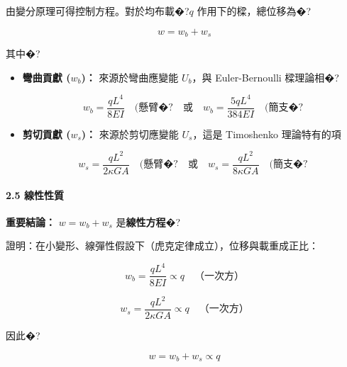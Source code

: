 \documentclass[UTF8, a4paper, 12pt]{ctexart}
\begin{document}
由變分原理可得控制方程。對於均布載�?$q$ 作用下的樑，總位移為�?



$$w = w_b + w_s$$



其中�?

\begin{itemize}

    \item \textbf{彎曲貢獻 ($w_b$)：} 來源於彎曲應變能 $U_b$，與 Euler-Bernoulli 樑理論相�?

    \begin{equation}

        w_b = \frac{qL^4}{8EI} \quad \text{(懸臂�?} \quad \text{或} \quad w_b = \frac{5qL^4}{384EI} \quad \text{(簡支�?}

    \end{equation}

    

    \item \textbf{剪切貢獻 ($w_s$)：} 來源於剪切應變能 $U_s$，這是 Timoshenko 理論特有的項

    \begin{equation}

        w_s = \frac{qL^2}{2\kappa GA} \quad \text{(懸臂�?} \quad \text{或} \quad w_s = \frac{qL^2}{8\kappa GA} \quad \text{(簡支�?}

    \end{equation}

\end{itemize}



\paragraph{2.5 線性性質}



\textbf{重要結論：} $w = w_b + w_s$ 是\textbf{線性方程}�?



證明：在小變形、線彈性假設下（虎克定律成立），位移與載重成正比：



$$w_b = \frac{qL^4}{8EI} \propto q \quad \text{（一次方）}$$

$$w_s = \frac{qL^2}{2\kappa GA} \propto q \quad \text{（一次方）}$$



因此�?

$$w = w_b + w_s \propto q$$
\end{document}
